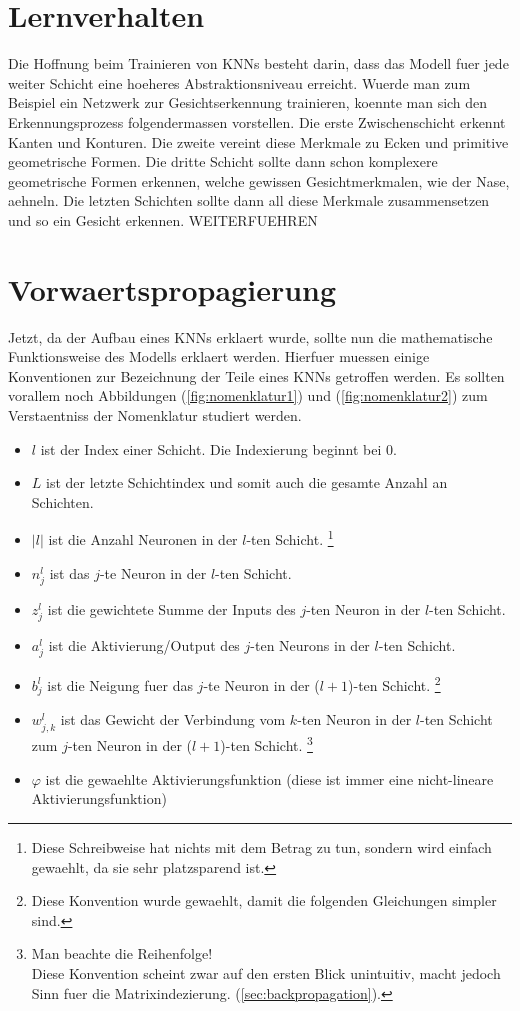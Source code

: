 \section{Lernverhalten}
Die Hoffnung beim Trainieren von KNNs besteht darin, dass das Modell fuer jede
weiter Schicht eine hoeheres Abstraktionsniveau erreicht. Wuerde man zum
Beispiel ein Netzwerk zur Gesichtserkennung trainieren, koennte man sich den
Erkennungsprozess folgendermassen vorstellen. Die erste Zwischenschicht erkennt
Kanten und Konturen. Die zweite vereint diese Merkmale zu Ecken und primitive
geometrische Formen. Die dritte Schicht sollte dann schon komplexere
geometrische Formen erkennen, welche gewissen Gesichtmerkmalen, wie der Nase, aehneln. Die letzten Schichten sollte dann all diese
Merkmale zusammensetzen und so ein Gesicht erkennen.
WEITERFUEHREN

\section{Vorwaertspropagierung}
Jetzt, da der Aufbau eines KNNs erklaert wurde, sollte nun die mathematische Funktionsweise
des Modells erklaert werden. Hierfuer muessen einige Konventionen zur
Bezeichnung der Teile eines KNNs getroffen werden. Es sollten vorallem noch
Abbildungen (\ref{fig:nomenklatur1}) und (\ref{fig:nomenklatur2}) zum Verstaentniss der Nomenklatur studiert werden.
\begin{itemize}
\item{$l$ ist der Index einer Schicht. Die Indexierung beginnt bei 0.}
\item{$L$ ist der letzte Schichtindex und somit auch die gesamte Anzahl an Schichten.}
\item{$|l|$ ist die Anzahl Neuronen in der $l$-ten Schicht.
    \footnote{
      Diese Schreibweise hat nichts mit dem Betrag zu tun, sondern wird einfach
      gewaehlt, da sie sehr platzsparend ist.
    }
  }
\item{$n_j^l$ ist das $j$-te Neuron in der $l$-ten Schicht.}
\item{$z_j^l$ ist die gewichtete Summe der Inputs des $j$-ten Neuron in der $l$-ten Schicht.}
\item{$a_j^l$ ist die Aktivierung/Output des $j$-ten Neurons in der $l$-ten Schicht.}
\item{$b_j^l$ ist die Neigung fuer das $j$-te Neuron in der ($l+1$)-ten Schicht.
    \footnote{
      Diese Konvention wurde gewaehlt, damit die folgenden Gleichungen simpler sind.
    }
  }
\item{$w_{j,k}^l$ ist das Gewicht der Verbindung vom $k$-ten Neuron
    in der $l$-ten Schicht zum $j$-ten Neuron in der ($l+1$)-ten Schicht.
    \footnote{
      Man beachte die Reihenfolge!\\
      Diese Konvention scheint zwar auf den ersten Blick unintuitiv, macht jedoch
      Sinn fuer die Matrixindezierung.
      (\ref{sec:backpropagation}).
    }
  }
\item{$\varphi$ ist die gewaehlte Aktivierungsfunktion (diese ist immer eine
    nicht-lineare Aktivierungsfunktion)}
\end{itemize}

